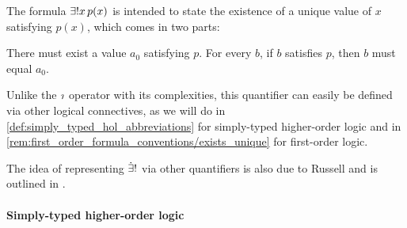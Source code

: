 \begin{concept}
\begin{thmenum}
    The formula \( \qExists* x p(x) \) is intended to state the existence of a unique value of \( x \) satisfying \( p(x) \), which comes in two parts:
    \begin{thmenum}
       There must exist a value \( a_0 \) satisfying \( p \).
       For every \( b \), if \( b \) satisfies \( p \), then \( b \) must equal \( a_0 \).
    \end{thmenum}

    Unlike the \( \rotiota \) operator with its complexities, this quantifier can easily be defined via other logical connectives, as we will do in \cref{def:simply_typed_hol_abbreviations} for simply-typed higher-order logic and in \cref{rem:first_order_formula_conventions/exists_unique} for first-order logic.
  \end{thmenum}
\end{concept}
\begin{comments}
  \item The idea of representing \( \mathord{\dot{\exists} !} \) via other quantifiers is also due to Russell and is outlined in \cite{Russell1905OnDenoting}.
\end{comments}

\paragraph{Simply-typed higher-order logic}

